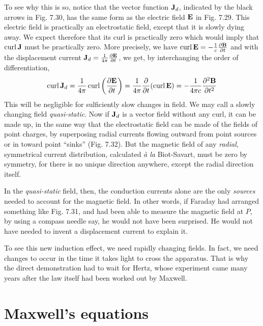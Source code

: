 To see why this is so, notice that the vector function $\mathbf{J}_d$, indicated
by the black arrows in Fig. 7.30, has the same form as the electric
field $\mathbf{E}$ in Fig. 7.29. This electric field is practically an electrostatic
field, except that it is slowly dying away. We expect therefore that
its curl is practically zero which would imply that $\operatorname{curl}\mathbf{J}$ must be
practically zero. More precisely, we have $\operatorname{curl}\mathbf{E} = -\frac{1}{c}\frac{\partial\mathbf{B}}{\partial t}$ and
with the displacement current $\mathbf{J}_d=\frac{1}{4\pi}\frac{\partial\mathbf{E}}{\partial t}$,
we get, by interchanging the order of differentiation,
\begin{equation}
  \operatorname{curl} \mathbf{J}_d = \frac{1}{4\pi}\operatorname{curl}\left(\frac{\partial\mathbf{E}}{\partial t}\right)
        = \frac{1}{4\pi}\frac{\partial}{\partial t}(\operatorname{curl}\mathbf{E})
        = -\frac{1}{4\pi c}\frac{\partial^2\mathbf{B}}{\partial t^2}
\end{equation}
This will be negligible for sulficiently slow changes in field. We
may call a slowly changing field \emph{quasi-static}.
Now if $\mathbf{J}_d$ is a vector
field without any curl, it can be made up, in the same way that the
electrostatic field can be made of the fields of point charges, by superposing
radial currents flowing outward from point sources or in
toward point ``sinks'' (Fig. 7.32). But the magnetic field of any
\emph{radial}, symmetrical current distribution, calculated \emph{\`a la} Biot-Savart,
must be zero by symmetry, for there is no unique direction anywhere,
except the radial direction itself.

In the \emph{quasi-static} field, then, the conduction currents alone are
the only \emph{sources} needed to account for the magnetic field. In other
words, if Faraday had arranged something like Fig. 7.31, and had
been able to measure the magnetic field at $P$, by using a compass
needle say, he would not have been surprised. He would not have
needed to invent a displacement current to explain it.


To see this new induction effect, we need rapidly changing fields.
In fact, we need changes to occur in the time it takes light to cross
the apparatus. That is why the direct demonstration had to wait for
Hertz, whose experiment came many years after the law itself had
been worked out by Maxwell.

\section{Maxwell's equations}

